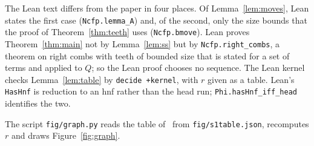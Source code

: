 \documentclass[11pt]{amsart}
\begin{document}
The Lean text differs from the paper in four places. Of Lemma~\ref{lem:moves}, Lean states the
first case (\texttt{Ncfp.lemma\_A}) and, of the second, only the size bounds that the proof of
Theorem~\ref{thm:teeth} uses (\texttt{Ncfp.bmove}). Lean proves
Theorem~\ref{thm:main} not by Lemma~\ref{lem:ss} but by \texttt{Ncfp.right\_combs}, a theorem on
right combs with teeth of bounded size that is stated for a set of terms and applied to $Q$; so
the Lean proof chooses no sequence. The Lean kernel checks Lemma~\ref{lem:table} by
\texttt{decide +kernel}, with $r$ given as a table. Lean's \texttt{HasHnf} is reduction to an hnf
rather than the head run; \texttt{Phi.hasHnf\_iff\_head} identifies the two.

The script \texttt{fig/graph.py} reads the table of~\citep{s1} from \texttt{fig/s1table.json},
recomputes $r$ and draws Figure~\ref{fig:graph}.



\end{document}

